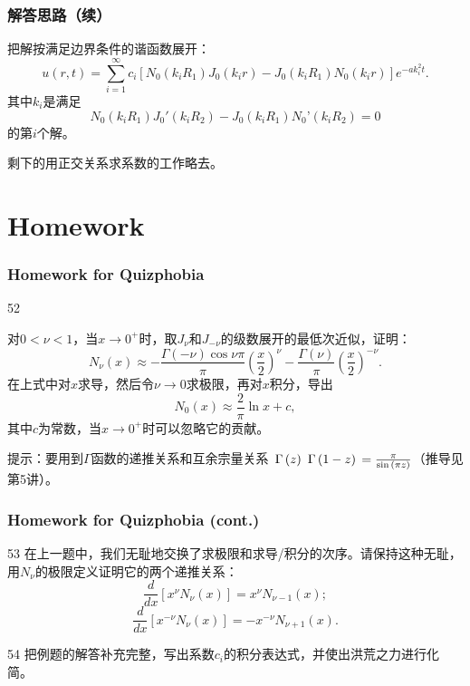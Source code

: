 \documentclass[CJK]{beamer}
\begin{document}
\begin{frame}
\frametitle{解答思路（续）}

把解按满足边界条件的谐函数展开：
$$ u(r, t) = \sum_{i=1}^\infty c_i\left[N_0(k_iR_1) J_0(k_ir) - J_0(k_iR_1) N_0(k_ir)\right]e^{-ak_i^2t} .$$
其中$k_i$是满足
$$ N_0(k_iR_1) J_0'(k_iR_2) - J_0(k_iR_1) N_0’(k_iR_2) = 0 $$
的第$i$个解。

\skiplines

剩下的用正交关系求系数的工作略去。

\end{frame}





\section{Homework}

\begin{frame}
\frametitle{Homework for Quizphobia}

\bitem
\item[52]{对$0<\nu<1$，当$x\rightarrow 0^+$时，取$J_\nu$和$J_{-\nu}$的级数展开的最低次近似，证明：
  $$N_\nu(x) \approx -\frac{\Gamma(-\nu)\cos{\nu\pi}}{\pi}\left(\frac{x}{2}\right)^\nu - \frac{\Gamma(\nu)}{\pi}\left(\frac{x}{2}\right)^{-\nu}. $$
  在上式中对$x$求导，然后令$\nu\rightarrow 0$求极限，再对$x$积分，导出
  $$ N_0(x)\approx \frac{2}{\pi}\ln x + c,$$
  其中$c$为常数，当$x\rightarrow 0^+$时可以忽略它的贡献。

  \skiplines
      {\small \darkgreen 提示：要用到$\Gamma$函数的递推关系和互余宗量关系
        $\,\Gamma\left( z \right)\,\,\Gamma\left( 1-z \right)\,=\frac{\pi}{\sin{(\pi z)}}$（推导见第5讲）。}}
  \eitem

\end{frame}


\begin{frame}
\frametitle{Homework for Quizphobia (cont.)}
\bitem
\item[53]{在上一题中，我们无耻地交换了求极限和求导/积分的次序。请保持这种无耻，用$N_\nu$的极限定义证明它的两个递推关系：
  $$ \frac{d}{dx}\left[x^\nu N_\nu(x)\right] = x^\nu N_{\nu -1}(x);$$
  $$ \frac{d}{dx}\left[x^{-\nu} N_\nu(x)\right] = -x^{-\nu} N_{\nu +1}(x).  $$
}
\item[54]{把例题的解答补充完整，写出系数$c_i$的积分表达式，并使出洪荒之力进行化简。}  \eitem
\end{frame}

\ech
\end{document}
